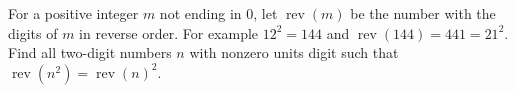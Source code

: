 For a positive integer $m$ not ending in $0$, let $\operatorname{rev}(m)$ be the number with the digits of $m$ in reverse order. For example $12^2=144$ and $\operatorname{rev}(144)=441=21^2$. Find all two-digit numbers $n$ with nonzero units digit such that $\operatorname{rev}(n^2)=\operatorname{rev}(n)^2$.
